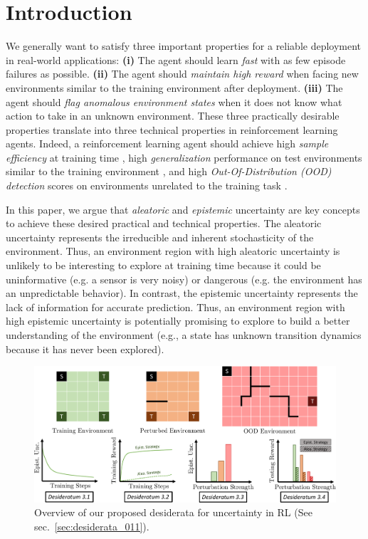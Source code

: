 \vspace{-3mm}
\section{Introduction}
\label{sec:introduction_011}

We generally want to satisfy three important properties for a reliable deployment in real-world applications: \textbf{(i)} The agent should learn \emph{fast} with as few episode failures as possible. \textbf{(ii)} The agent should \emph{maintain high reward} when facing new environments similar to the training environment after deployment. \textbf{(iii)} The agent should \emph{flag anomalous environment states} when it does not know what action to take in an unknown environment. These three practically desirable properties translate into three technical properties in reinforcement learning agents. Indeed, a reinforcement learning agent should achieve high \emph{sample efficiency} at training time \citep{sample-efficient-ac}, high \emph{generalization} performance on test environments similar to the training environment \citep{epistemic-pomdp}, and high \emph{Out-Of-Distribution (OOD) detection} scores on environments unrelated to the training task \citep{ood-detection-survey, ood-automotive-perception}. 

In this paper, we argue that \emph{aleatoric} and \emph{epistemic} uncertainty are key concepts to achieve these desired practical and technical properties. The aleatoric uncertainty represents the irreducible and inherent stochasticity of the environment. Thus, an environment region with high aleatoric uncertainty is unlikely to be interesting to explore at training time because it could be uninformative (e.g. a sensor is very noisy) or dangerous (e.g. the environment has an unpredictable behavior). In contrast, the epistemic uncertainty represents the lack of information for accurate prediction. Thus, an environment region with high epistemic uncertainty is potentially promising to explore to build a better understanding of the environment (e.g., a state has unknown transition dynamics because it has never been explored).

\begin{figure}[t]
    \centering
    \includegraphics[width=.99\linewidth]{sections/011_icml2022/resources/diagram-cropped_2.pdf}
    \caption{Overview of our proposed desiderata for uncertainty in RL (See sec.~\ref{sec:desiderata_011}).}
    \label{fig:diagram}
\end{figure}

